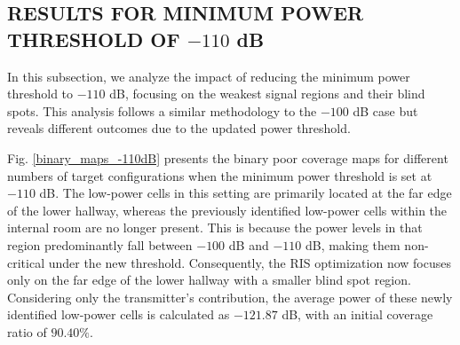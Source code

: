\documentclass{IEEEoj}
\begin{document}
\subsection{RESULTS FOR MINIMUM POWER THRESHOLD OF $-110$ dB}
In this subsection, we analyze the impact of reducing the minimum power threshold to $-110$ dB, focusing on the weakest signal regions and their blind spots. This analysis follows a similar methodology to the $-100$ dB case but reveals different outcomes due to the updated power threshold.

Fig. \ref{binary_maps_-110dB} presents the binary poor coverage maps for different numbers of target configurations when the minimum power threshold is set at $-110$ dB. The low-power cells in this setting are primarily located at the far edge of the lower hallway, whereas the previously identified low-power cells within the internal room are no longer present. This is because the power levels in that region predominantly fall between $-100$ dB and $-110$ dB, making them non-critical under the new threshold. Consequently, the RIS optimization now focuses only on the far edge of the lower hallway with a smaller blind spot region. Considering only the transmitter's contribution, the average power of these newly identified low-power cells is calculated as $-121.87$ dB, with an initial coverage ratio of $90.40\%$.
\end{document}
